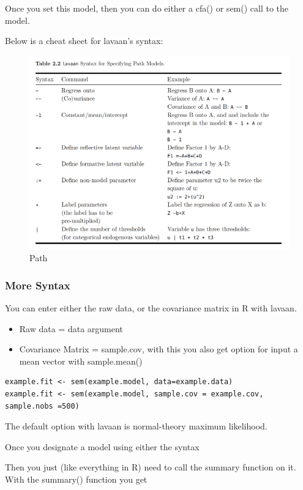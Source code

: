 \documentclass[]{book}
\providecommand{\tightlist}{%
  \setlength{\itemsep}{0pt}\setlength{\parskip}{0pt}}
\theoremstyle{definition}
\theoremstyle{definition}
\theoremstyle{definition}
\theoremstyle{remark}
\begin{document}
Once you set this model, then you can do either a cfa() or sem() call to
the model.

Below is a cheat sheet for lavaan's syntax:

\begin{figure}
\centering
\includegraphics{img/beaupath4.png}
\caption{Path}
\end{figure}

\subsubsection{More Syntax}\label{more-syntax}

You can enter either the raw data, or the covariance matrix in R with
lavaan.

\begin{itemize}
\tightlist
\item
  Raw data = data argument
\item
  Covariance Matrix = sample.cov, with this you also get option for
  input a mean vector with sample.mean()
\end{itemize}

\begin{verbatim}
example.fit <- sem(example.model, data=example.data)
example.fit <- sem(example.model, sample.cov = example.cov, sample.nobs =500)
\end{verbatim}

The default option with lavaan is normal-theory maximum likelihood.

Once you designate a model using either the syntax

Then you just (like everything in R) need to call the summary function
on it. With the summary() function you get
\end{document}
